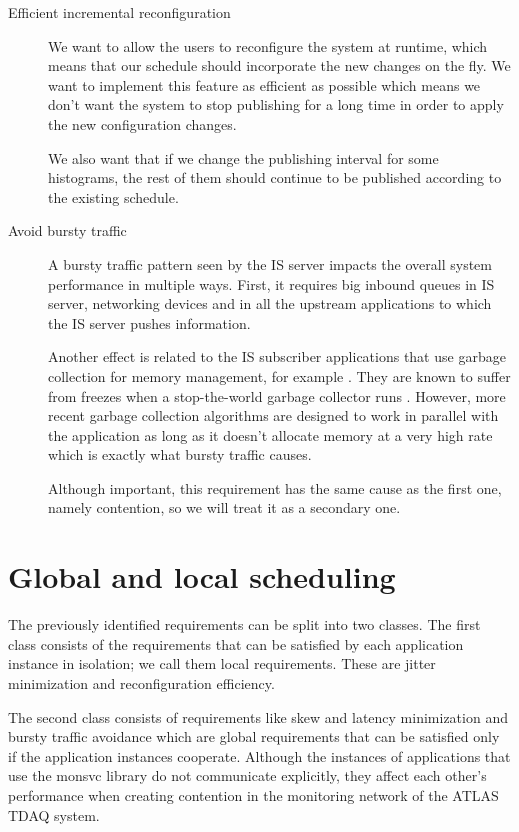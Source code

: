 \begin{description}
\item [Efficient incremental reconfiguration]

We want to allow the users to reconfigure the system at runtime, which means that our schedule should incorporate the new changes on the fly. We want to implement this feature as efficient as possible which means we don't want the system to stop publishing for a long time in order to apply the new configuration changes. 

We also want that if we change the publishing interval for some histograms, the rest of them should continue to be published according to the existing schedule.

\item [Avoid bursty traffic]

A bursty traffic pattern seen by the IS server impacts the overall system performance in multiple ways. First, it requires big inbound queues in IS server, networking devices and in all the upstream applications to which the IS server pushes information. 

Another effect is related to the IS subscriber applications that use garbage collection for memory management, for example \citep{sicoe2012persistent}. They are known to suffer from freezes when a stop-the-world garbage collector runs \citep{aho2007compilers}. However, more recent garbage collection algorithms \citep{printezis2005garbage} are designed to work in parallel with the application as long as it doesn't allocate memory at a very high rate which is exactly what bursty traffic causes.

Although important, this requirement has the same cause as the first one, namely contention, so we will treat it as a secondary one.

\end{description}

\section{Global and local scheduling}

The previously identified requirements can be split into two classes. The first class consists of the requirements that can be satisfied by each application instance in isolation; we call them local requirements. These are jitter minimization and reconfiguration efficiency. 

The second class consists of requirements like skew and latency minimization and bursty traffic avoidance which are global requirements that can be satisfied only if the application instances cooperate. Although the instances of applications that use the monsvc library do not communicate explicitly, they affect each other’s performance when creating contention in the monitoring network of the ATLAS TDAQ system. 

